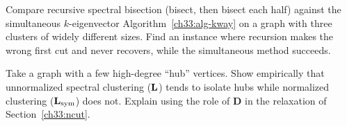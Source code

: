 \begin{exercise}
Compare recursive spectral bisection (bisect, then bisect each half) against the simultaneous $k$-eigenvector
Algorithm~\ref{ch33:alg-kway} on a graph with three clusters of widely different sizes. Find an instance
where recursion makes the wrong first cut and never recovers, while the simultaneous method succeeds.
\end{exercise}

\begin{exercise}
Take a graph with a few high-degree ``hub'' vertices. Show empirically that unnormalized spectral
clustering ($\mathbf{L}$) tends to isolate hubs while normalized clustering ($\mathbf{L}_{\mathrm{sym}}$) does not.
Explain using the role of $\mathbf{D}$ in the relaxation of Section~\ref{ch33:ncut}.
\end{exercise}
